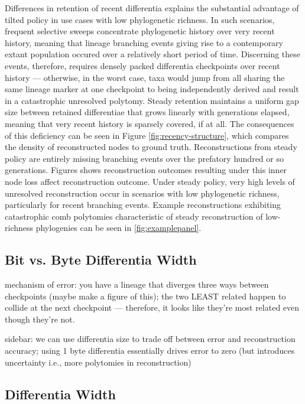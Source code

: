 Differences in retention of recent differentia explains the substantial advantage of tilted policy in use cases with low phylogenetic richness.
In such scenarios, frequent selective sweeps concentrate phylogenetic history over very recent history, meaning that lineage branching events giving rise to a contemporary extant population occured over a relatively short period of time.
Discerning these events, therefore, requires densely packed differentia checkpoints over recent history --- otherwise, in the worst case, taxa would jump from all sharing the same lineage marker at one checkpoint to being independently derived and result in a catastrophic unresolved polytomy.
Steady retention maintains a uniform gap size between retained differentiae that grows linearly with generations elapsed, meaning that very recent history is sparsely covered, if at all.
The consequences of this deficiency can be seen in Figure \ref{fig:recency-structure}, which compares the density of reconstructed nodes to ground truth.
Reconstructions from steady policy are entirely missing branching events over the prefatory hundred or so generations.
Figures  shows reconstruction outcomes resulting under this inner node loss affect reconstruction outcome.
Under steady policy, very high levels of unresolved reconstruction occur in scenarios with low phylogenetic richness, particularly for recent branching events.
Example reconstructions exhibiting catastrophic comb polytomies characteristic of steady reconstruction of low-richness phylogenies can be seen in \ref{fig:examplepanel}.

\subsection{Bit vs. Byte Differentia Width} \label{sec:bit-vs-byte}

mechanism of error: you have a lineage that diverges three ways between checkpoints (maybe make a figure of this); the two LEAST related happen to collide at the next checkpoint --- therefore, it looks like they're most related even though they're not.

sidebar: we can use differentia size to trade off between error and reconstruction accuracy; using 1 byte differentia essentially drives error to zero (but introduces uncertainty i.e., more polytomies in reconstruction)

\subsection{Differentia Width} \label{sec:bit-vs-byte}

